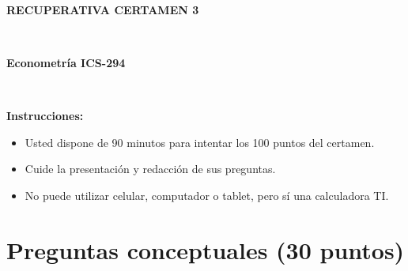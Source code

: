 \documentclass[10pt,a4paper]{article}
\begin{document}
\vspace{5cm}



\begin{center}
\begin{large}
\textbf{\\RECUPERATIVA CERTAMEN 3}
\end{large}\\
\end{center}

\begin{center}
\begin{large}
\textbf{Econometría ICS-294}
\end{large}\\

\end{center}

\textbf{Instrucciones:} 

\begin{itemize}

    \item Usted dispone de 90 minutos  para intentar los 100 puntos del certamen.
    \item Cuide la presentación y redacción de sus preguntas.
    \item No puede utilizar celular, computador o tablet, pero sí una calculadora TI.
     
\end{itemize}

\section{Preguntas conceptuales (30 puntos)}
\end{document}
